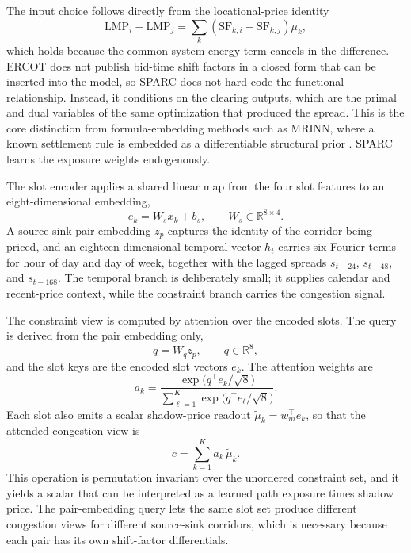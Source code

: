 \documentclass[twoside]{article}
\begin{document}
The input choice follows directly from the locational-price identity
\begin{equation}
\mathrm{LMP}_i - \mathrm{LMP}_j
= \sum_{k} \left( \mathrm{SF}_{k,i} - \mathrm{SF}_{k,j} \right) \mu_k,
\end{equation}
which holds because the common system energy term cancels in the difference. ERCOT does not publish bid-time shift factors in a closed form that can be inserted into the model, so SPARC does not hard-code the functional relationship. Instead, it conditions on the clearing outputs, which are the primal and dual variables of the same optimization that produced the spread. This is the core distinction from formula-embedding methods such as MRINN, where a known settlement rule is embedded as a differentiable structural prior \citep{yu2026marketruleinformed}. SPARC learns the exposure weights endogenously.

The slot encoder applies a shared linear map from the four slot features to an eight-dimensional embedding,
\begin{equation}
e_k = W_s x_k + b_s,
\qquad W_s \in \mathbb{R}^{8 \times 4}.
\end{equation}
A source-sink pair embedding $z_p$ captures the identity of the corridor being priced, and an eighteen-dimensional temporal vector $h_t$ carries six Fourier terms for hour of day and day of week, together with the lagged spreads $s_{t-24}$, $s_{t-48}$, and $s_{t-168}$. The temporal branch is deliberately small; it supplies calendar and recent-price context, while the constraint branch carries the congestion signal.

The constraint view is computed by attention over the encoded slots. The query is derived from the pair embedding only,
\begin{equation}
q = W_q z_p,
\qquad q \in \mathbb{R}^{8},
\end{equation}
and the slot keys are the encoded slot vectors $e_k$. The attention weights are
\begin{equation}
a_k = \frac{\exp\!\bigl( q^\top e_k / \sqrt{8} \bigr)}
{\sum_{\ell=1}^{K} \exp\!\bigl( q^\top e_\ell / \sqrt{8} \bigr)}.
\end{equation}
Each slot also emits a scalar shadow-price readout $\tilde{\mu}_k = w_m^\top e_k$, so that the attended congestion view is
\begin{equation}
c = \sum_{k=1}^{K} a_k \, \tilde{\mu}_k.
\end{equation}
This operation is permutation invariant over the unordered constraint set, and it yields a scalar that can be interpreted as a learned path exposure times shadow price. The pair-embedding query lets the same slot set produce different congestion views for different source-sink corridors, which is necessary because each pair has its own shift-factor differentials.
\end{document}
